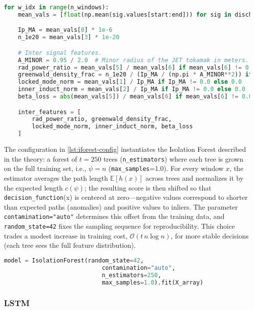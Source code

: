 \begin{lstlisting}[language=Python, caption={Inter-signal features extraction}, label={lst:inter-signal-features}]
for w_idx in range(n_windows):
    mean_vals = [float(np.mean(sig.values[start:end])) for sig in discharge.signals]

    Ip_MA = mean_vals[0] * 1e-6
    n_1e20 = mean_vals[3] * 1e-20

    # Inter signal features.
    A_MINOR = 0.95 / 2.0  # Minor radius of the JET tokamak in meters. Used in the Greenwald limit.
    rad_power_ratio = mean_vals[5] / mean_vals[6] if mean_vals[6] != 0.0 else 0.0
    greenwald_density_frac = n_1e20 / (Ip_MA / (np.pi * A_MINOR**2)) if Ip_MA != 0.0 else 0.0
    locked_mode_norm = mean_vals[1] / Ip_MA if Ip_MA != 0.0 else 0.0
    inner_induct_norm = mean_vals[2] / Ip_MA if Ip_MA != 0.0 else 0.0
    beta_loss = abs(mean_vals[5]) / mean_vals[6] if mean_vals[6] != 0.0 else 0.0

    inter_features = [
        rad_power_ratio, greenwald_density_frac,
        locked_mode_norm, inner_induct_norm, beta_loss
    ]
\end{lstlisting}

The configuration in \autoref{lst:iforest-config} instantiates the Isolation Forest described in the theory: a forest of $t=250$ trees (\texttt{n\_estimators}) where each tree is grown on the full training set, i.e., $\psi=n$ (\texttt{max\_samples}=1.0). For every window $x$, the estimator averages the path length $\mathbb{E}[h(x)]$ across trees and normalizes it by the expected length $c(\psi)$; the resulting score is then shifted so that \texttt{decision\_function}(x) is centered at zero—negative values correspond to shorter than expected paths (anomalies) and positive values to inliers. The parameter \texttt{contamination="auto"} determines this offset from the training data, and \texttt{random\_state=42} fixes the sampling sequence for reproducibility. This choice trades a modest increase in training cost, $\mathcal{O}(t\,n\log n)$, for more stable decisions (each tree sees the full feature distribution).

\begin{lstlisting}[language=Python, caption={Isolation Forest model configuration}, label={lst:iforest-config}]
    model = IsolationForest(random_state=42, 
                            contamination="auto",
                            n_estimators=250,
                            max_samples=1.0).fit(X_array)
\end{lstlisting}



\subsubsection{\acs{LSTM}}

